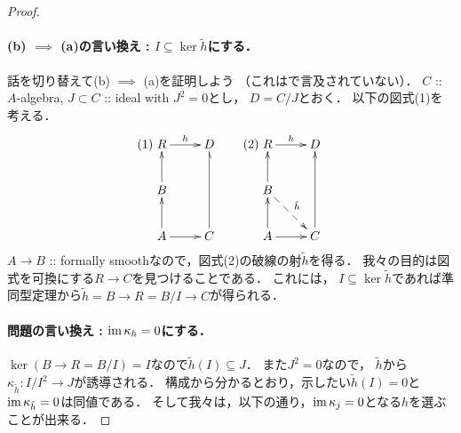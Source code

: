 \documentclass[a4paper]{jsarticle}
\begin{document}
\begin{proof}
    \paragraph{(b) $\implies$ (a)の言い換え : $I \subseteq \ker \tilde{h}$にする．}
    話を切り替えて(b) $\implies$ (a)を証明しよう
    （これは\cite{Mat}で言及されていない）．
    $C$ :: $A$-algebra, $J \subset C$ :: ideal with $J^2=0$とし，
    $D=C/J$とおく．
    以下の図式(1)を考える．
    \[
    (1)\xymatrix{
        R \ar[r]^-{h}& D \\
        B \ar[u]& {} \\
        A \ar[u]\ar[r]& C \ar@{-_>}[uu]
    }
    \qquad
    (2)\xymatrix{
        R \ar[r]^-{h}& D \\
        B \ar[u]\ar@{-->}[rd]^-{\tilde{h}}& {} \\
        A \ar[u]\ar[r]& C \ar[uu]
    }
    \]
    $A \to B$ :: formally smoothなので，図式(2)の破線の射$\tilde{h}$を得る．
    我々の目的は図式を可換にする$R \to C$を見つけることである．
    これには，
    $I \subseteq \ker \tilde{h}$であれば準同型定理から$\tilde{h}=B \to R=B/I \to C$が得られる．
    
    \paragraph{問題の言い換え : $\operatorname{im} \kappa_{h}=0$にする．}
    $\ker (B \to R=B/I)=I$なので$\tilde{h}(I) \subseteq J$．
    また$J^2=0$なので，
    $\tilde{h}$から$\kappa_{\tilde{h}} \colon I/I^2 \to J$が誘導される．
    構成から分かるとおり，示したい$\tilde{h}(I)=0$と$\operatorname{im} \kappa_{\tilde{h}}=0$は同値である．
    そして我々は，以下の通り，$\operatorname{im} \kappa_{j}=0$となる$h$を選ぶことが出来る．


\end{proof}
\end{document}
